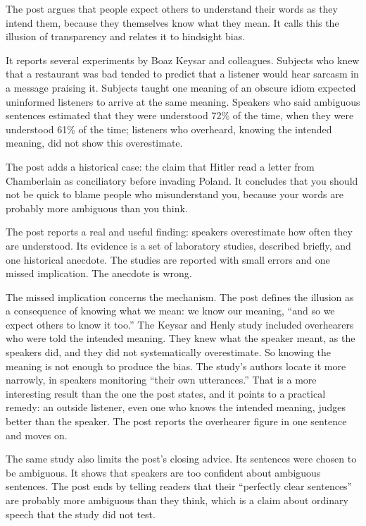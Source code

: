 \begin{afterword}
\summaryhead

The post argues that people expect others to understand their words as they intend them, because they themselves know what they mean. It calls this the illusion of transparency and relates it to hindsight bias.

It reports several experiments by Boaz Keysar and colleagues. Subjects who knew that a restaurant was bad tended to predict that a listener would hear sarcasm in a message praising it. Subjects taught one meaning of an obscure idiom expected uninformed listeners to arrive at the same meaning. Speakers who said ambiguous sentences estimated that they were understood 72\% of the time, when they were understood 61\% of the time; listeners who overheard, knowing the intended meaning, did not show this overestimate.

The post adds a historical case: the claim that Hitler read a letter from Chamberlain as conciliatory before invading Poland. It concludes that you should not be quick to blame people who misunderstand you, because your words are probably more ambiguous than you think.

\responsehead

The post reports a real and useful finding: speakers overestimate how often they are understood. Its evidence is a set of laboratory studies, described briefly, and one historical anecdote. The studies are reported with small errors and one missed implication. The anecdote is wrong.

The missed implication concerns the mechanism. The post defines the illusion as a consequence of knowing what we mean: we know our meaning, ``and so we expect others to know it too.'' The Keysar and Henly study included overhearers who were told the intended meaning. They knew what the speaker meant, as the speakers did, and they did not systematically overestimate. So knowing the meaning is not enough to produce the bias. The study's authors locate it more narrowly, in speakers monitoring ``their own utterances.'' That is a more interesting result than the one the post states, and it points to a practical remedy: an outside listener, even one who knows the intended meaning, judges better than the speaker. The post reports the overhearer figure in one sentence and moves on.

The same study also limits the post's closing advice. Its sentences were chosen to be ambiguous. It shows that speakers are too confident about ambiguous sentences. The post ends by telling readers that their ``perfectly clear sentences'' are probably more ambiguous than they think, which is a claim about ordinary speech that the study did not test.


\end{afterword}
